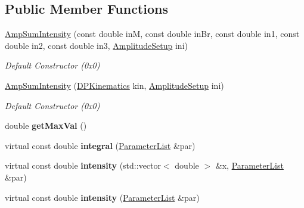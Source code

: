 \subsection*{Public Member Functions}
\begin{DoxyCompactItemize}
\item 
\hypertarget{class_amp_sum_intensity_abf5de602d6f8960805a105036754cb48}{\hyperlink{class_amp_sum_intensity_abf5de602d6f8960805a105036754cb48}{Amp\-Sum\-Intensity} (const double in\-M, const double in\-Br, const double in1, const double in2, const double in3, \hyperlink{class_amplitude_setup}{Amplitude\-Setup} ini)}\label{class_amp_sum_intensity_abf5de602d6f8960805a105036754cb48}

\begin{DoxyCompactList}\small\item\em Default Constructor (0x0) \end{DoxyCompactList}\item 
\hypertarget{class_amp_sum_intensity_ac5e45d36c35d8be011d37661d4a3a290}{\hyperlink{class_amp_sum_intensity_ac5e45d36c35d8be011d37661d4a3a290}{Amp\-Sum\-Intensity} (\hyperlink{class_d_p_kinematics}{D\-P\-Kinematics} kin, \hyperlink{class_amplitude_setup}{Amplitude\-Setup} ini)}\label{class_amp_sum_intensity_ac5e45d36c35d8be011d37661d4a3a290}

\begin{DoxyCompactList}\small\item\em Default Constructor (0x0) \end{DoxyCompactList}\item 
\hypertarget{class_amp_sum_intensity_a1214ad0183f6269bc0f53bb75eaa393a}{double {\bfseries get\-Max\-Val} ()}\label{class_amp_sum_intensity_a1214ad0183f6269bc0f53bb75eaa393a}

\item 
\hypertarget{class_amp_sum_intensity_aa864d46a78d52843d7fb4774244103a0}{virtual const double {\bfseries integral} (\hyperlink{class_parameter_list}{Parameter\-List} \&par)}\label{class_amp_sum_intensity_aa864d46a78d52843d7fb4774244103a0}

\item 
\hypertarget{class_amp_sum_intensity_a58c7d7fcc155adaa4bb93b28a7c21228}{virtual const double {\bfseries intensity} (std\-::vector$<$ double $>$ \&x, \hyperlink{class_parameter_list}{Parameter\-List} \&par)}\label{class_amp_sum_intensity_a58c7d7fcc155adaa4bb93b28a7c21228}

\item 
\hypertarget{class_amp_sum_intensity_a08fe49ab53719fb9a3ea687c4cf18ed0}{virtual const double {\bfseries intensity} (\hyperlink{class_parameter_list}{Parameter\-List} \&par)}\label{class_amp_sum_intensity_a08fe49ab53719fb9a3ea687c4cf18ed0}


\end{DoxyCompactItemize}
